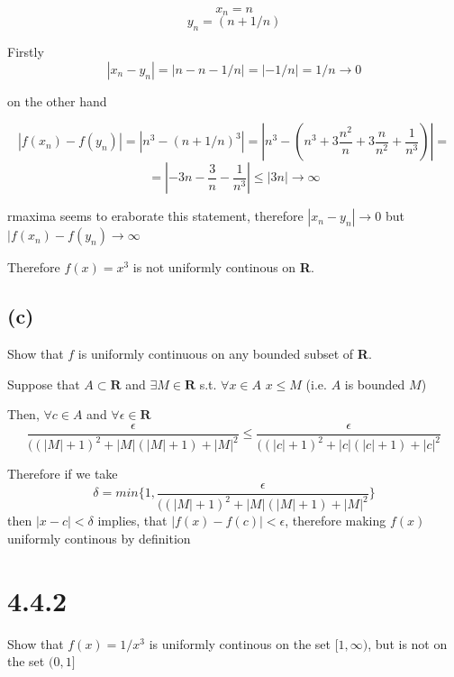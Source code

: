 \documentclass[11pt,oneside,titlepage]{article}
\begin{document}
$$x_n = n$$
$$y_n = (n + 1/n)$$

Firstly
$$ |x_n - y_n| = |n - n - 1/n| = |-1/n| = 1/n \to 0$$

on the other hand

$$|f(x_n) - f(y_n)| = |n ^ 3 - (n + 1/n) ^ 3| = |n^3 - (n^3 + 3 \frac{n^2}{n} + 3 \frac{n}{n^2} + \frac{1}{n^3})| = $$
$$ = |-3n - \frac{3}{n} - \frac{1}{n^3} | \leqslant |3n| \to \infty$$

rmaxima seems to eraborate this statement, therefore  $|x_n - y_n| \to 0$ but $|f(x_n) - f(y_n) \to \infty$

Therefore $f(x) = x^3$ is not uniformly continous on \textbf{R}.

\subsection*{(c)}
Show that $f$ is uniformly continuous on any bounded subset of \textbf{R}.

Suppose that $A \subset \textbf{R}$ and $\exists M \in \textbf{R}$ s.t. $\forall x \in A$ $x \leqslant M$
(i.e. $A$ is bounded $M$)

Then, $\forall c \in A$ and $\forall \epsilon \in \textbf{R}$
$$\frac{\epsilon}{((|M| + 1)^{2} + |M|(|M| + 1) + |M|^2}  \leqslant \frac{\epsilon}{((|c| + 1)^{2} + |c|(|c| + 1) + |c|^2} $$

Therefore if we take
$$\delta = min\{1, \frac{\epsilon}{((|M| + 1)^{2} + |M|(|M| + 1) + |M|^2}\} $$
then $|x - c| < \delta$ implies, that $ |f(x) - f(c)| < \epsilon$, therefore making $f(x)$ uniformly
continous by definition


\section*{4.4.2}
Show that $f(x) = 1/x^3$  is uniformly continous on the set $[1, \infty)$, but is not on the set $(0, 1]$
\end{document}
